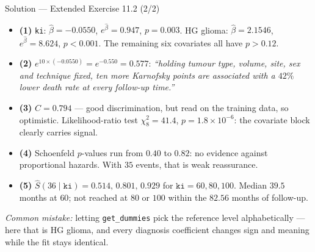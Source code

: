 \documentclass[aspectratio=169,11pt]{beamer}
\begin{document}
\begin{frame}{Solution --- Extended Exercise 11.2 (2/2)}
\begin{solutionbox}
  \begin{itemize}
    \item \textbf{(1)} \texttt{ki}: $\hat\beta=-0.0550$, $e^{\hat\beta}=0.947$,
          $p=0.003$. HG glioma: $\hat\beta=2.1546$, $e^{\hat\beta}=8.624$, $p<0.001$.
          The remaining six covariates all have $p>0.12$.
    \item \textbf{(2)} $e^{10\times(-0.0550)}=e^{-0.550}=0.577$: \emph{``holding tumour
          type, volume, site, sex and technique fixed, ten more Karnofsky points are
          associated with a $42\%$ lower death rate at every follow-up time.''}
    \item \textbf{(3)} $C=0.794$ --- good discrimination, but read on the training data,
          so optimistic. Likelihood-ratio test $\chi^2_8=41.4$,
          $p=1.8\times10^{-6}$: the covariate block clearly carries signal.
    \item \textbf{(4)} Schoenfeld $p$-values run from $0.40$ to $0.82$: no evidence
          against proportional hazards. With $35$ events, that is weak reassurance.
    \item \textbf{(5)} $\hat S(36\mid \texttt{ki})=0.514,\,0.801,\,0.929$ for
          $\texttt{ki}=60,80,100$. Median $39.5$ months at $60$; not reached at $80$ or
          $100$ within the $82.56$ months of follow-up.
  \end{itemize}
  \smallskip
  \textit{Common mistake:} letting \texttt{get\_dummies} pick the reference level
  alphabetically --- here that is HG glioma, and every diagnosis coefficient changes sign
  and meaning while the fit stays identical.
\end{solutionbox}
\end{frame}
\end{document}
